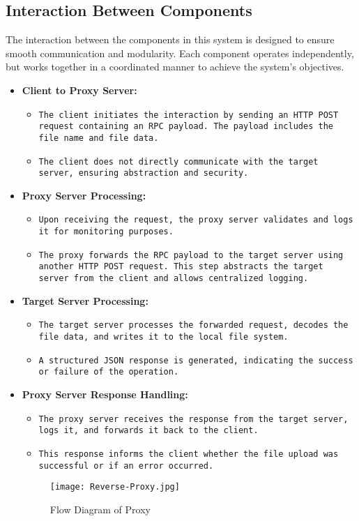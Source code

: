 \documentclass{article}
\begin{document}
\subsection{Interaction Between Components}
The interaction between the components in this system is designed to ensure smooth communication and modularity. Each component operates independently, but works together in a coordinated manner to achieve the system's objectives.
\begin{itemize}
\RaggedRight
    \item \textbf{Client to Proxy Server:}
    \begin{itemize}
        \item \texttt{The client initiates the interaction by sending an HTTP POST request containing an RPC payload. The payload includes the file name and file data.}
        \item \texttt{The client does not directly communicate with the target server, ensuring abstraction and security.}
    \end{itemize}

    \item \textbf{Proxy Server Processing:}
    \begin{itemize}
        \item \texttt{Upon receiving the request, the proxy server validates and logs it for monitoring purposes.}
        \item \texttt{The proxy forwards the RPC payload to the target server using another HTTP POST request. This step abstracts the target server from the client and allows centralized logging.}
    \end{itemize}

    \item \textbf{Target Server Processing:}
    \begin{itemize}
        \item \texttt{The target server processes the forwarded request, decodes the file data, and writes it to the local file system.}
        \item \texttt{A structured JSON response is generated, indicating the success or failure of the operation.}
    \end{itemize}

    \item \textbf{Proxy Server Response Handling:}
    \begin{itemize}
        \item \texttt{The proxy server receives the response from the target server, logs it, and forwards it back to the client.}
        \item \texttt{This response informs the client whether the file upload was successful or if an error occurred.}
    \end{itemize}
        \begin{figure}[H]
        \centering
        \texttt{[image: Reverse-Proxy.jpg]}
        \caption{Flow Diagram of Proxy}
        \label{fig:enter-label}
    \end{figure}
\end{itemize}
\end{document}
